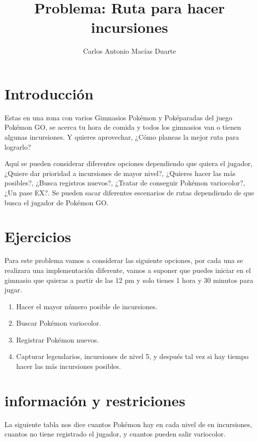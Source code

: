 \documentclass[10pt,letterpaper,twoside,openright]{article}
\author{Carlos Antonio Macías Duarte}
\title{Problema: Ruta para hacer incursiones}
\begin{document}
	\maketitle
		
	\section{Introducción}
	
		Estas en una zona con varios Gimnasios Pokémon y Poképaradas del juego Pokémon GO, se acerca tu hora de comida y todos los gimnasios van o tienen algunas incursiones. Y quieres aprovechar, ¿Cómo planeas la mejor ruta para lograrlo?
		
		Aquí se pueden considerar diferentes opciones dependiendo que quiera el jugador, ¿Quiere dar prioridad a incursiones de mayor nivel?, ¿Quieres hacer las más posibles?, ¿Busca registros nuevos?, ¿Tratar de conseguir Pokémon variocolor?, ¿Un pase EX?. Se pueden sacar diferentes escenarios de rutas dependiendo de que busca el jugador de Pokémon GO.
		
	\section{Ejercicios}
	
		Para este problema vamos a considerar las siguiente opciones, por cada una se realizara una implementación diferente, vamos a suponer que puedes iniciar en el gimnasio que quieras a partir de las 12 pm y solo tienes 1 hora y 30 minutos para jugar.
		
		
		\begin{enumerate}
			\item Hacer el mayor número posible de incursiones.
			\item Buscar Pokémon variocolor.
			\item Registrar Pokémon nuevos.
			\item Capturar legendarios, incursiones de nivel 5, y después tal vez si hay tiempo hacer las más incursiones posibles.
		\end{enumerate}
		
	\section{información y restriciones}
	
	La siguiente tabla nos dice cuantos Pokémon hay en cada nivel de en incursiones, cuantos no tiene registrado el jugador, y cuantos pueden salir variocolor.
	
\end{document}
